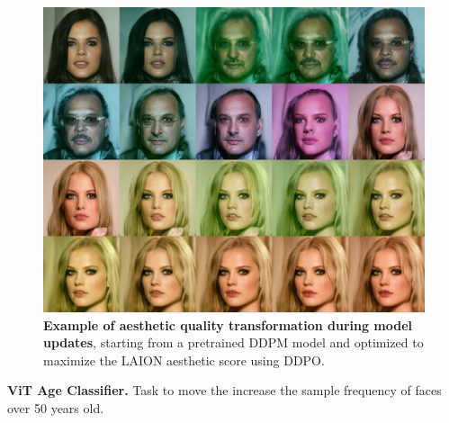 \begin{figure}[ht]
  \centering
  \includegraphics[scale=1.40]{img/results/laion_60.png}
  \vspace{-0pt}  %
    \captionsetup{width=\textwidth} %
    \caption{\textbf{Example of aesthetic quality transformation during model updates}, starting from a pretrained DDPM model and optimized to maximize the LAION aesthetic score using DDPO.}
    \label{fig:ddpm-to-ddpo-aesthetic}
\end{figure}

\noindent \textbf{ViT Age Classifier.} Task to move the increase the sample frequency of faces over 50 years old.

